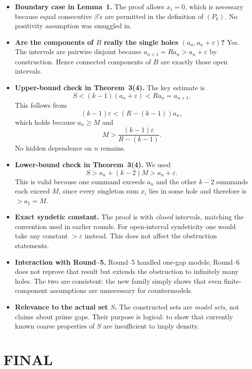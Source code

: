 \begin{itemize}
\item \textbf{Boundary case in Lemma~1.}
The proof allows $x_i=0$, which is necessary because equal consecutive $\beta$'s are permitted in the definition of $(P_k)$. No positivity assumption was smuggled in.

\item \textbf{Are the components of $B$ really the single holes $(a_n,a_n+\varepsilon)$?}
Yes. The intervals are pairwise disjoint because $a_{n+1}=Ra_n>a_n+\varepsilon$ by construction. Hence connected components of $B$ are exactly those open intervals.

\item \textbf{Upper-bound check in Theorem~3(4).}
The key estimate is
\[
S<(k-1)(a_n+\varepsilon)<Ra_n=a_{n+1}.
\]
This follows from
\[
(k-1)\varepsilon < (R-(k-1))a_n,
\]
which holds because $a_n\ge M$ and
\[
M>\frac{(k-1)\varepsilon}{R-(k-1)}.
\]
No hidden dependence on $n$ remains.

\item \textbf{Lower-bound check in Theorem~3(4).}
We used
\[
S>a_n+(k-2)M>a_n+\varepsilon.
\]
This is valid because one summand exceeds $a_n$ and the other $k-2$ summands each exceed $M$, since every singleton sum $x_i$ lies in some hole and therefore is $>a_1=M$.

\item \textbf{Exact syndetic constant.}
The proof is with \emph{closed} intervals, matching the convention used in earlier rounds. For open-interval syndeticity one would take any constant $>\varepsilon$ instead. This does not affect the obstruction statements.

\item \textbf{Interaction with Round--5.}
Round--5 handled one-gap models; Round--6 does not reprove that result but extends the obstruction to infinitely many holes. The two are consistent: the new family simply shows that even finite-component assumptions are unnecessary for countermodels.

\item \textbf{Relevance to the actual set $S$.}
The constructed sets are \emph{model sets}, not claims about prime gaps. Their purpose is logical: to show that currently known coarse properties of $S$ are insufficient to imply density.
\end{itemize}


\section{FINAL}

